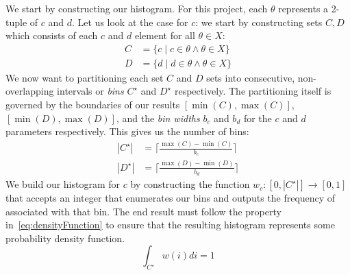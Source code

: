 We start by constructing our histogram.
For this project, each $\theta$ represents a 2-tuple of $c$ and $d$.
Let us look at the case for $c$: we start by constructing sets $C, D$ which consists of each $c$ and $d$ element for
all $\theta \in X$:
\begin{align}
    C &= \{c \mid c \in \theta \land \theta \in X \} \\
    D &= \{d \mid d \in \theta \land \theta \in X \}
\end{align}
We now want to partitioning each set $C$ and $D$ sets into consecutive, non-overlapping intervals or \emph{bins}
$C^\star$ and $D^\star$ respectively.
The partitioning itself is governed by the boundaries of our results $[\min(C), \max(C)]$,
$[\min(D),\max(D)]$, and the \emph{bin widths} $b_c$ and $b_d$ for the $c$ and $d$ parameters respectively.
This gives us the number of bins:
\begin{equation}
    \begin{aligned}
        | C^\star | &= \lceil \frac{\max(C) - \min(C)}{b_c} \rceil \\
        | D^\star | &= \lceil \frac{\max(D) - \min(D)}{b_d} \rceil
    \end{aligned}
\end{equation}
We build our histogram for $c$ by constructing the function $w_c : [0, |C^\star |] \rightarrow [0, 1]$ that accepts
an integer that enumerates our bins and outputs the frequency of associated with that bin.
The end result must follow the property in~\autoref{eq:densityFunction} to ensure that the resulting histogram
represents some probability density function.
\begin{equation} \label{eq:densityFunction}
    \int_{C^\star} w(i) di = 1
\end{equation}

